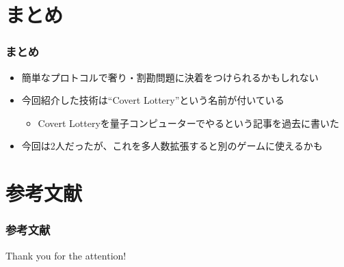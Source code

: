 \section{まとめ}

\begin{frame}
  \frametitle{まとめ}

  \pause
  \begin{itemize}
    \item<+-> 簡単なプロトコルで奢り・割勘問題に決着をつけられるかもしれない

    \item<+-> 今回紹介した技術は``Covert Lottery\cite{covert_lottery}''という名前が付いている
    \begin{itemize}
      \item Covert Lotteryを量子コンピューターでやるという記事\cite{quantum_covert_lottery}を過去に書いた
    \end{itemize}

    \item<+-> 今回は2人だったが、これを多人数拡張すると別のゲームに使えるかも
  \end{itemize}
\end{frame}

\section*{参考文献}
\begin{frame}%
  \frametitle{参考文献}
  \nocite{*}
  
  
\end{frame}

\begin{frame}
  \centering
  {\Huge Thank you for the attention!}
\end{frame}


